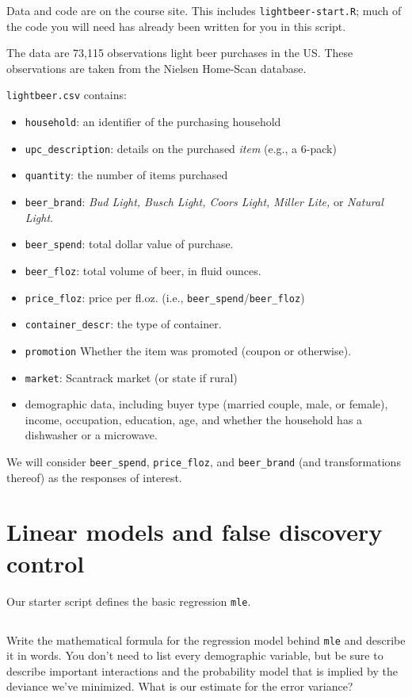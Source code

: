 \documentclass[12pt]{article}
\begin{document}
\noindent
Data and code are on the course site. 
	This includes {\tt lightbeer-start.R}; 
	much of the code you will need has already been written for you in this script.


\medskip\noindent
The data are 73,115 observations light beer purchases in the US. These observations are taken from the Nielsen Home-Scan database.

\bigskip\noindent
{\tt lightbeer.csv} contains:
\begin{itemize}
\item \texttt{household}: an identifier of the purchasing household
\item \texttt{upc\_description}: details on the purchased {\it item} (e.g., a 6-pack)
\item \texttt{quantity}: the number of items purchased
\item \texttt{beer\_brand}:  \textit{Bud Light, Busch Light, Coors Light, Miller Lite,} or \textit{Natural Light}.
\item \texttt{beer\_spend}:  total dollar value of purchase.
\item \texttt{beer\_floz}: total volume of beer, in fluid ounces.
\item \texttt{price\_floz}: price per fl.oz. (i.e., \texttt{beer\_spend}/\texttt{beer\_floz})
\item \texttt{container\_descr}: the type of container. 
\item \texttt{promotion} Whether the item was promoted (coupon or otherwise). 
\item \texttt{market}: Scantrack market (or state if rural)
\item demographic data, including buyer type (married couple, male, or female), income, occupation, education, age, and whether the household has a dishwasher or a microwave.
\end{itemize}
We will consider \texttt{beer\_spend}, \texttt{price\_floz}, and \texttt{beer\_brand} (and transformations thereof) as the responses of interest.


\newpage
\section{Linear models and false discovery control}

\bigskip
Our starter script defines the basic regression \texttt{mle}.

\subsection{}
Write the mathematical formula for the regression model behind \texttt{mle} and describe it in words.  You don't need to list every demographic variable, but be sure to describe important interactions and the probability model that is implied by the deviance we've minimized.  What is our estimate for the error variance?
\end{document}
